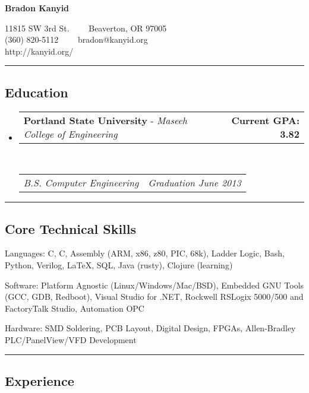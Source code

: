 \documentclass[10pt,letterpaper]{article}
\makeatletter
\newenvironment{indentsection}[1]%
{\begin{list}{}%
	{\setlength{\leftmargin}{#1}}%
	\item[]%
}
{\end{list}}
\newcommand{\headerrow}[2]
{\begin{tabular*}{\linewidth}{l@{\extracolsep{\fill}}r}
	#1 &
	#2 \\
\end{tabular*}}
\newcommand{\CPP}
{C\nolinebreak[4]\hspace{-.05em}\raisebox{.22ex}{\footnotesize\bf ++}}
\makeatother
\begin{document}
\begin{center}
{\LARGE \textbf{Bradon Kanyid}}

11815 SW 3rd St.\ \ \textbullet
\ \ Beaverton, OR 97005
\\
(360) 820-5112\ \ \textbullet
\ \ bradon@kanyid.org
\\
http://kanyid.org/
\end{center}


\hrule
\vspace{-0.4em}
\subsection*{Education}

\begin{itemize}
	\parskip=0.1em

	\item 
	\headerrow
  {\textbf{Portland State University} - \emph{Maseeh College of Engineering}}
		{\textbf{Current GPA: 3.82}}
	\\
	\headerrow
		{\emph{B.S. Computer Engineering}}
		{\emph{Graduation June 2013}}
\end{itemize}

\hrule
\vspace{-0.4em}
\subsection*{Core Technical Skills}

\begin{indentsection}{\parindent}
\begin{description*}
	\item[Languages:]
    C, \CPP, Assembly (ARM, x86, z80, PIC, 68k), Ladder Logic, Bash, Python, Verilog, \LaTeX, SQL, Java (rusty), Clojure (learning)
	\item[Software:]
    Platform Agnostic (Linux/Windows/Mac/BSD), Embedded GNU Tools (GCC, GDB, Redboot), Visual Studio for .NET, Rockwell RSLogix 5000/500 and FactoryTalk Studio, Automation OPC 
	\item[Hardware:]
    SMD Soldering, PCB Layout, Digital Design, FPGAs, Allen-Bradley PLC/PanelView/VFD Development 

\end{description*}
\end{indentsection}

\hrule
\vspace{-0.4em}
\subsection*{Experience}
\end{document}
